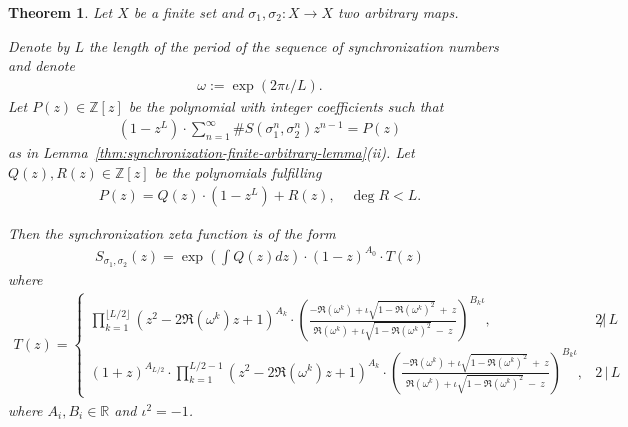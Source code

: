 \documentclass[oneside]{amsart}
\def\Z{\mathbb{Z}}
\def\R{\mathbb{R}}
\newtheorem{thm}{Theorem}
\begin{document}
\begin{thm}
  Let $X$ be a finite set and $\sigma_1, \sigma_2: X \to X$ two arbitrary maps.

  Denote by $L$ the length of the period of the sequence of synchronization numbers and denote
  \begin{align*}
    \omega:=\exp(2\pi \iota / L).
  \end{align*}
  Let $P(z) \in \Z[z]$ be the polynomial with integer coefficients such that
  \begin{align*}
    \left(1 - z^L \right) \cdot \sum_{n=1}^\infty \# S(\sigma_1^n, \sigma_2^n) z^{n-1} = P(z)
  \end{align*}
  as in {\rm Lemma~\ref{thm:synchronization-finite-arbitrary-lemma}(ii)}.
  Let $Q(z), R(z) \in \Z[z]$ be the polynomials fulfilling
  \begin{align*}
    P(z) = Q(z) \cdot (1-z^L) + R(z), \quad \deg R < L.
  \end{align*}

  Then the synchronization zeta function is of the form
  \begin{align*}
    S_{\sigma_1,\sigma_2}(z) = \exp \left( \int Q(z) dz \right) \cdot (1-z)^{A_0} \cdot T(z)
  \end{align*}
  where
  \begin{align*}
    T(z) = \begin{cases}
      \prod_{k=1}^{\lfloor L/2 \rfloor} \left( z^2 - 2\Re(\omega^k)z+1 \right)^{A_k}
      \cdot \left( \frac{-\Re(\omega^k) + \iota\sqrt{1-\Re(\omega^k)^2} \ + \ z}{\Re(\omega^k) + \iota\sqrt{1-\Re(\omega^k)^2} \ - \ z} \right)^{B_k \iota}, & 2 \!\not|\, L \\[1ex]
      (1+z)^{A_{L/2}} \cdot
      \prod_{k=1}^{L/2-1} \left( z^2 - 2\Re(\omega^k)z+1 \right)^{A_k}
      \cdot \left( \frac{-\Re(\omega^k) + \iota\sqrt{1-\Re(\omega^k)^2} \ +\ z}{\Re(\omega^k) + \iota\sqrt{1-\Re(\omega^k)^2} \ -\ z} \right)^{B_k \iota}, & 2 \,|\, L
     \end{cases}
  \end{align*}
  where $A_i, B_i \in \R$ and $\iota^2 = -1$.
\end{thm}
\end{document}
